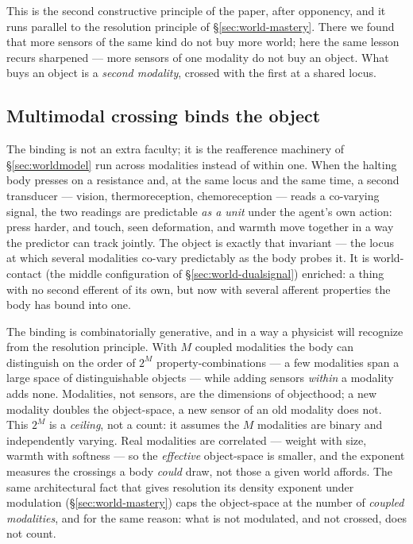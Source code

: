 \documentclass{article}
\begin{document}
This is the second constructive principle of the paper, after opponency,
and it runs parallel to the resolution principle of
\S\ref{sec:world-mastery}.  There we found that more sensors of the same
kind do not buy more world; here the same lesson recurs sharpened ---
more sensors of one modality do not buy an object.  What buys an object
is a \emph{second modality}, crossed with the first at a shared locus.

\subsection{Multimodal crossing binds the object}\label{sec:object-crossing}

The binding is not an extra faculty; it is the reafference machinery of
\S\ref{sec:worldmodel} run across modalities instead of within one.
When the halting body presses on a resistance and, at the same locus and
the same time, a second transducer --- vision, thermoreception,
chemoreception --- reads a co-varying signal, the two readings are
predictable \emph{as a unit} under the agent's own action: press
harder, and touch, seen deformation, and warmth move together in a way
the predictor can track jointly.  The object is exactly that invariant
--- the locus at which several modalities co-vary predictably as the
body probes it.  It is world-contact (the middle configuration of
\S\ref{sec:world-dualsignal}) enriched: a thing with no second efferent
of its own, but now with several afferent properties the body has bound
into one.

The binding is combinatorially generative, and in a way a physicist will
recognize from the resolution principle.  With $M$ coupled modalities the
body can distinguish on the order of $2^{M}$ property-combinations --- a
few modalities span a large space of distinguishable objects --- while
adding sensors \emph{within} a modality adds none.  Modalities, not
sensors, are the dimensions of objecthood; a new modality doubles the
object-space, a new sensor of an old modality does not.  This $2^{M}$ is a
\emph{ceiling}, not a count: it assumes the $M$ modalities are binary and
independently varying.  Real modalities are correlated --- weight with
size, warmth with softness --- so the \emph{effective} object-space is
smaller, and the exponent measures the crossings a body \emph{could} draw,
not those a given world affords.  The same
architectural fact that gives resolution its density exponent under
modulation (\S\ref{sec:world-mastery}) caps the object-space at the number
of \emph{coupled modalities}, and for the same reason: what is not
modulated, and not crossed, does not count.
\end{document}
